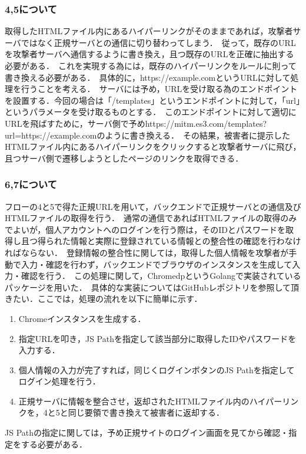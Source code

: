 \documentclass[dvipdfmx]{jsarticle}
\begin{document}
        \subsubsection{4,5について}
            取得したHTMLファイル内にあるハイパーリンクがそのままであれば，攻撃者サーバではなく正規サーバとの通信に切り替わってしまう．\
            従って，既存のURLを攻撃者サーバへ通信するように書き換え，且つ既存のURLを正確に抽出する必要がある．\
            これを実現する為には，既存のハイパーリンクをルールに則って書き換える必要がある．\
            具体的に，https://example.comというURLに対して処理を行うことを考える．\
            サーバには予め，URLを受け取る為のエンドポイントを設置する．今回の場合は「/templates」というエンドポイントに対して，「url」というパラメータを受け取るものとする．\
            このエンドポイントに対して適切にURLを飛ばすために，サーバ側で予めhttps://mitm.es3.com/templates?url=https://example.comのように書き換える．\
            その結果，被害者に提示したHTMLファイル内にあるハイパーリンクをクリックすると攻撃者サーバに飛び，且つサーバ側で遷移しようとしたページのリンクを取得できる．
        \subsubsection{6,7について}
            フローの4と5で得た正規URLを用いて，バックエンドで正規サーバとの通信及びHTMLファイルの取得を行う．\
            通常の通信であればHTMLファイルの取得のみでよいが，個人アカウントへのログインを行う際は，そのIDとパスワードを取得し且つ得られた情報と実際に登録されている情報との整合性の確認を行わなければならない．\
            登録情報の整合性に関しては，取得した個人情報を攻撃者が手動で入力・確認を行わず，バックエンドでブラウザのインスタンスを生成して入力・確認を行う．\
            この処理に関して，ChromedpというGolangで実装されているパッケージを用いた．\
            具体的な実装についてはGitHubレポジトリを参照して頂きたい．ここでは，処理の流れを以下に簡単に示す．
            \begin{enumerate}
                \item Chromeインスタンスを生成する．
                \item 指定URLを叩き，JS Pathを指定して該当部分に取得したIDやパスワードを入力する．
                \item 個人情報の入力が完了すれば，同じくログインボタンのJS Pathを指定してログイン処理を行う．
                \item 正規サーバに情報を整合させ，返却されたHTMLファイル内のハイパーリンクを，4と5と同じ要領で書き換えて被害者に返却する．
            \end{enumerate}
            JS Pathの指定に関しては，予め正規サイトのログイン画面を見てから確認・指定をする必要がある．
\end{document}

